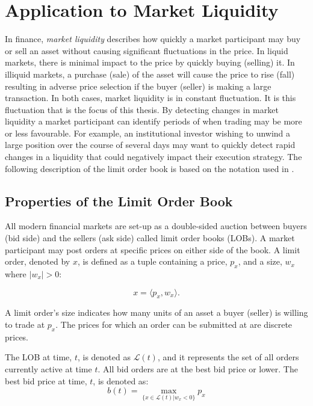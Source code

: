 \chapter{Application to Market Liquidity}

In finance, \textit{market liquidity} describes how quickly a market participant may buy or sell an asset without causing significant fluctuations in the price. In liquid markets, there is minimal impact to the price by quickly buying (selling) it. In illiquid markets, a purchase (sale) of the asset will cause the price to rise (fall) resulting in adverse price selection if the buyer (seller) is making a large transaction. In both cases, market liquidity is in constant fluctuation. It is this fluctuation that is the focus of this thesis. 
By detecting changes in market liquidity a market participant can identify periods of when trading may be more or less favourable. For example, an institutional investor wishing to unwind a large position over the course of several days may want to quickly detect rapid changes in a liquidity that could negatively impact their execution strategy. The following description of the limit order book is based on the notation used in \cite{gould2016queue}. 

\section{Properties of the Limit Order Book}
All modern financial markets are set-up as a double-sided auction between buyers (bid side) and the sellers (ask side) called limit order books (LOBs). A market participant may post orders at specific prices on either side of the book. A limit order, denoted by $x$, is defined as a tuple containing a price, $p_x$, and a size, $w_x$ where $|w_x|>0$:

\begin{equation}
x = \langle p_x, w_x \rangle.
\end{equation}

A limit order's size indicates how many units of an asset a buyer (seller) is willing to trade at $p_x$. The prices for which an order can be submitted at are discrete prices. 

The LOB at time, $t$, is denoted as $\mathcal{L}(t)$, and it represents the set of all orders currently active at time $t$. All bid orders are at the best bid price or lower. The best bid price at time, $t$,  is denoted as:
\begin{equation}
b(t) =  \max_{\{x \in \mathcal{L}(t)|w_x<0 \}} p_x
\end{equation}

